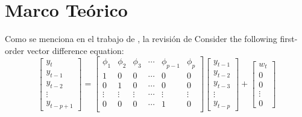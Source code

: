 	\chapter{Marco Teórico}\label{Cap: Marco Teórico}
		Como se menciona en el trabajo de \cite{Johnson-1987}, la revisión de \lipsum[10]
		Consider the following first-order vector difference equation: 
		\begin{equation}\label{eq: MED}
			\left[
			\begin{array}{c}
				y_{t}  \\
				y_{t-1}\\
				y_{t-2}\\
				\vdots \\
				y_{t-p+1}
			\end{array}
			\right] =
			\left[
			\begin{array}{cccccc}
				\phi_{1} & \phi_{2} & \phi_{3} & \cdots & \phi_{p-1} & \phi_{p}\\
				1    &    0     &    0     & \cdots &      0     &     0   \\
				0    &    1     &    0     & \cdots &      0     &     0   \\
				\vdots  &  \vdots  &  \vdots  & \cdots &   \vdots   &  \vdots \\
				0    &    0     &    0     & \cdots &      1     &     0   \\
			\end{array}
			\right]
			\left[
			\begin{array}{c}
				y_{t-1}\\
				y_{t-2}\\
				y_{t-3}\\
				\vdots \\
				y_{t-p}
			\end{array}
			\right] + 
			\left[
			\begin{array}{c}
				w_{t}\\
				0    \\
				0    \\
				\vdots \\
				0
			\end{array}
			\right]
		\end{equation}
